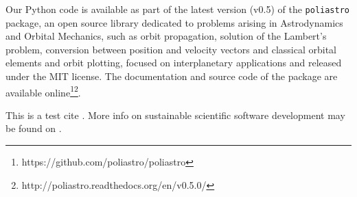 Our Python code is available as part of the latest version (v0.5) of the \verb|poliastro| package, an open source library dedicated to problems arising in Astrodynamics and Orbital Mechanics, such as orbit propagation, solution of the Lambert's problem, conversion between position and velocity vectors and classical orbital elements and orbit plotting, focused on interplanetary applications and released under the MIT license. The documentation and source code of the package are available online\footnote{https://github.com/poliastro/poliastro}\footnote{http://poliastro.readthedocs.org/en/v0.5.0/}.

This is a test cite \cite{Ziemer_2012}. More info on sustainable scientific software development may be found on \cite{brown2015run}.
